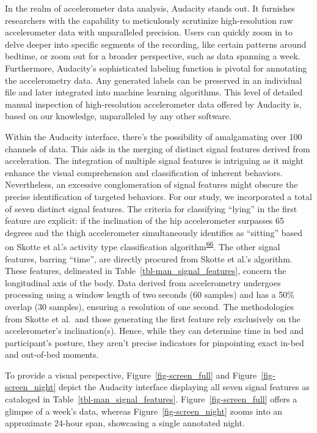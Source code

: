 \documentclass[
  9pt,
]{scrbook}
\begin{document}
In the realm of accelerometer data analysis, Audacity stands out. It
furnishes researchers with the capability to meticulously scrutinize
high-resolution raw accelerometer data with unparalleled precision.
Users can quickly zoom in to delve deeper into specific segments of the
recording, like certain patterns around bedtime, or zoom out for a
broader perspective, such as data spanning a week. Furthermore,
Audacity's sophisticated labeling function is pivotal for annotating the
accelerometry data. Any generated labels can be preserved in an
individual file and later integrated into machine learning algorithms.
This level of detailed manual inspection of high-resolution
accelerometer data offered by Audacity is, based on our knowledge,
unparalleled by any other software.

Within the Audacity interface, there's the possibility of amalgamating
over 100 channels of data. This aids in the merging of distinct signal
features derived from acceleration. The integration of multiple signal
features is intriguing as it might enhance the visual comprehension and
classification of inherent behaviors. Nevertheless, an excessive
conglomeration of signal features might obscure the precise
identification of targeted behaviors. For our study, we incorporated a
total of seven distinct signal features. The criteria for classifying
``lying'' in the first feature are explicit: if the inclination of the
hip accelerometer surpasses 65 degrees and the thigh accelerometer
simultaneously identifies as ``sitting'' based on Skotte et al.'s
activity type classification
algorithm\textsuperscript{\protect\hyperlink{ref-skotte_detection_2014}{66}}.
The other signal features, barring ``time'', are directly procured from
Skotte et al.'s algorithm. These features, delineated in
Table~\ref{tbl-man_signal_features}, concern the longitudinal axis of
the body. Data derived from accelerometry undergoes processing using a
window length of two seconds (60 samples) and has a 50\% overlap (30
samples), ensuring a resolution of one second. The methodologies from
Skotte et al.~and those generating the first feature rely exclusively on
the accelerometer's inclination(s). Hence, while they can determine time
in bed and participant's posture, they aren't precise indicators for
pinpointing exact in-bed and out-of-bed moments.

To provide a visual perspective, Figure~\ref{fig-screen_full} and
Figure~\ref{fig-screen_night} depict the Audacity interface displaying
all seven signal features as cataloged in
Table~\ref{tbl-man_signal_features}. Figure~\ref{fig-screen_full} offers
a glimpse of a week's data, whereas Figure~\ref{fig-screen_night} zooms
into an approximate 24-hour span, showcasing a single annotated night.
\end{document}
